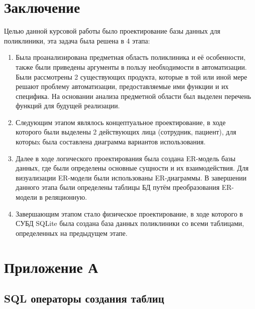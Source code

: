 \documentclass[14pt,a4paper,russian]{extreport}
\begin{document}
\chapter*{Заключение}
Целью данной курсовой работы было проектирование базы данных для поликлиники, эта задача
была решена в 4 этапа:
\begin{enumerate}[noitemsep]
    \item Была проанализирована предметная область поликлиника и её особенности, также были
        приведены аргументы в пользу необходимости в автоматизации. Были рассмотрены 2 существующих
        продукта, которые в той или иной мере решают проблему автоматизации, предоставляемые ими
        функции и их специфика. На основании анализа предметной области был выделен перечень
        функций для будущей реализации.
    \item Следующим этапом являлось концептуальное проектирование, в ходе которого были выделены 2
        действующих лица (сотрудник, пациент), для которыx была составлена
        диаграмма вариантов использования.
    \item Далее в ходе логического проектирования была создана ER-модель базы данных, где были
        определены основные сущности и их взаимодействия. Для визуализации ER-модели были
        использованы ER-диаграммы. В завершении данного этапа были определены таблицы БД путём
        преобразования ER-модели в реляционную.
    \item Завершающим этапом стало физическое проектирование, в ходе которого в СУБД SQLite была
        создана база данных поликлиники со всеми таблицами, определенных на предыдущем этапе.
\end{enumerate}

{}

\chapter*{Приложение А}

\setcounter{chapter}{5}
\setcounter{lstlisting}{0}


\section*{SQL операторы создания таблиц}
\end{document}
